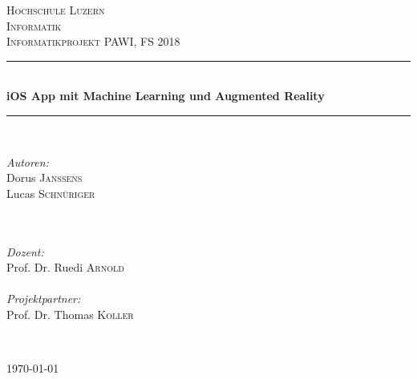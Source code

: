 \documentclass[11pt]{article} %
\begin{document}
\begin{titlepage}

\newcommand{\HRule}{\rule{\linewidth}{0.5mm}} %

\center

\textsc{\LARGE Hochschule Luzern\\Informatik}\\[1.5cm] %
\textsc{\Large Informatikprojekt PAWI, FS 2018}\\[1.5cm] %

\HRule \\[1cm]
{\huge \bfseries iOS App mit Machine Learning und Augmented Reality}\\[0.6cm] %
\HRule \\[1cm]

\vspace{30pt}

\begin{minipage}{0.4\textwidth}
  \begin{flushleft} \large
    \emph{Autoren:}\\
    Dorus \textsc{Janssens}\\
    Lucas \textsc{Schnüriger}\\
    ~\\~ %
  \end{flushleft}
\end{minipage}
\begin{minipage}{0.4\textwidth}
  \begin{flushleft} \large
    \emph{Dozent:}\\
    Prof. Dr. Ruedi \textsc{Arnold}\\~\\
    \emph{Projektpartner:}\\
    Prof. Dr. Thomas \textsc{Koller}
  \end{flushleft}
\end{minipage}\\[1cm]


\vspace{30pt}

{\large \today }\\[1cm] %

\end{titlepage}
\end{document}
